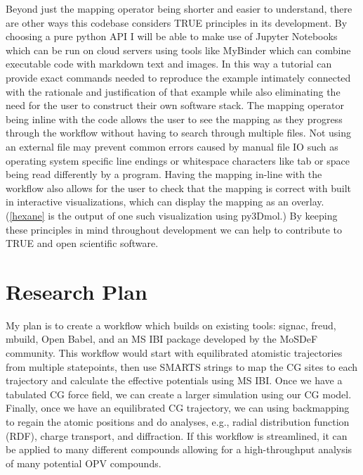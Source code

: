 Beyond just the mapping operator being shorter and easier to understand, there are other ways this codebase considers TRUE principles in its development.
By choosing a pure python API I will be able to make use of Jupyter Notebooks which can be run on cloud servers using tools like MyBinder which can combine executable code with markdown text and images\cite{mybinder, jupyter, notebooktutorials}.
In this way a tutorial can provide exact commands needed to reproduce the example intimately connected with the rationale and justification of that example while also eliminating the need for the user to construct their own software stack.
The mapping operator being inline with the code allows the user to see the mapping as they progress through the workflow without having to search through multiple files.
Not using an external file may prevent common errors caused by manual file IO such as operating system specific line endings or whitespace characters like tab or space being read differently by a program.
Having the mapping in-line with the workflow also allows for the user to check that the mapping is correct with built in interactive visualizations, which can display the mapping as an overlay. 
(\autoref{hexane} is the output of one such visualization using py3Dmol\cite{py3dmol}.)
By keeping these principles in mind throughout development we can help to contribute to TRUE and open scientific software.

\section*{Research Plan}

My plan is to create a workflow which builds on existing tools: signac, freud, mbuild, Open Babel, and an MS IBI package developed by the MoSDeF community.
This workflow would start with equilibrated atomistic trajectories from multiple statepoints, then use SMARTS strings to map the CG sites to each trajectory and calculate the effective potentials using MS IBI\@.
Once we have a tabulated CG force field, we can create a larger simulation using our CG model.
Finally, once we have an equilibrated CG trajectory, we can using backmapping to regain the atomic positions and do analyses, e.g., radial distribution function (RDF), charge transport, and diffraction.
If this workflow is streamlined, it can be applied to many different compounds allowing for a high-throughput analysis of many potential OPV compounds.

